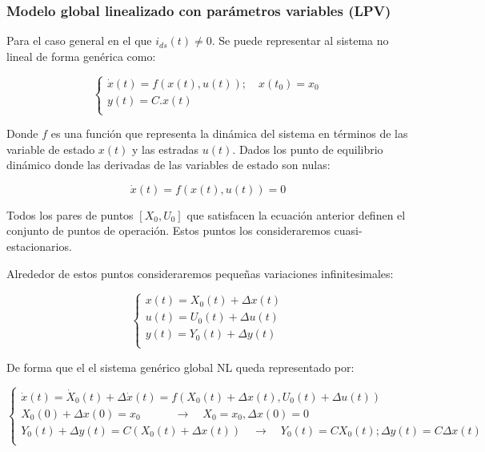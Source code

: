 \documentclass{article}
\begin{document}
\subsubsection{Modelo global linealizado con parámetros variables (LPV)}

Para el caso general en el que ${i}_{ds}(t) \neq 0$. Se puede representar al sistema no lineal de forma genérica
como: 

\begin{equation}
    \begin{cases}
        \dot{x}(t) = f(x(t),u(t));  \quad   x(t_{0}) = x_{0}\\
        y(t) = C.x(t)\\
    \end{cases}
\end{equation}

Donde $f$ es una función que representa la dinámica del sistema en términos de las variable 
de estado $x(t)$ y las estradas $u(t)$.  
Dados los punto de equilibrio dinámico donde las derivadas de las variables de estado son nulas:

\begin{equation}
    \dot{x}(t) = f(x(t),u(t)) = 0
\end{equation}

Todos los pares de puntos $[X_0,U_0]$ que satisfacen la ecuación anterior definen el conjunto de
puntos de operación. Estos puntos los consideraremos cuasi-estacionarios. 

Alrededor de estos puntos consideraremos pequeñas variaciones infinitesimales:

\begin{equation}
    \begin{cases}
        x(t) = X_{0}(t) + \Delta x(t)\\
        u(t) = U_{0}(t) + \Delta u(t)\\
        y(t) = Y_{0}(t) + \Delta y(t)\\
    \end{cases}
\end{equation}

De forma que el el sistema genérico global NL queda representado por:

\begin{equation}
    \begin{cases}
        \dot{x}(t) = \dot{X}_{0}(t) + \Delta\dot{x}(t) = f(X_{0}(t) + \Delta x(t), U_{0}(t) + \Delta u(t))\\
        X_{0}(0) + \Delta x(0) = x_{0} \quad\quad\quad \rightarrow \quad X_{0} = x_{0}, \Delta x(0) = 0 \\
        Y_{0}(t) + \Delta y(t) = C(X_{0}(t) + \Delta x(t)) \quad\rightarrow\quad Y_{0}(t) = C X_{0}(t); \Delta y(t) = C \Delta x(t)\\
    \end{cases}
\end{equation}
\end{document}
